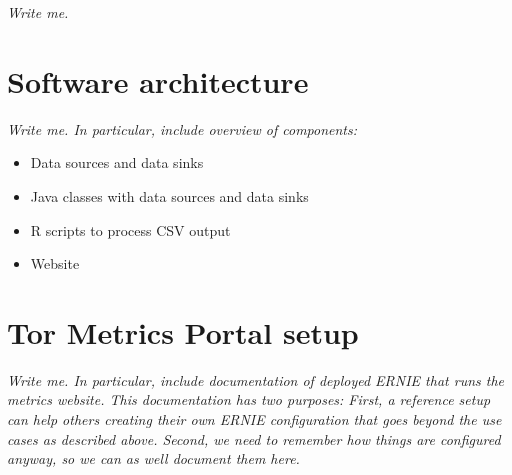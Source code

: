 \documentclass{article}
\begin{document}
{\it Write me.}

\section{Software architecture}

{\it Write me. In particular, include overview of components:

\begin{itemize}
\item Data sources and data sinks
\item Java classes with data sources and data sinks
\item R scripts to process CSV output
\item Website
\end{itemize}
}

\section{Tor Metrics Portal setup}

{\it
Write me. In particular, include documentation of deployed ERNIE that
runs the metrics website.
This documentation has two purposes:
First, a reference setup can help others creating their own ERNIE
configuration that goes beyond the use cases as described above.
Second, we need to remember how things are configured anyway, so we can
as well document them here.}
\end{document}
